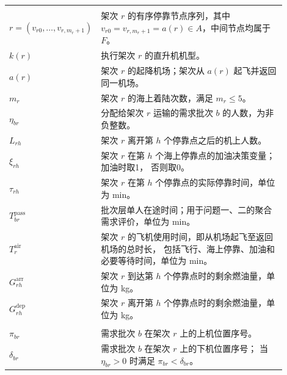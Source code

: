 \documentclass[UTF8,a4paper,zihao=5]{ctexart}
\begin{document}
\begin{longtable}{
    >{\centering\arraybackslash}p{0.20\linewidth}
    p{0.70\linewidth}
}
    \midrule
    \multicolumn{2}{l}{\textbf{路线状态变量}} \\[2pt]

    $r=(v_{r0},\ldots,v_{r,m_r+1})$
    & 架次 $r$ 的有序停靠节点序列，其中
    $v_{r0}=v_{r,m_r+1}=a(r)\in A$，中间节点均属于 $F$。 \\

    $k(r)$
    & 执行架次 $r$ 的直升机机型。 \\

    $a(r)$
    & 架次 $r$ 的起降机场；架次从 $a(r)$ 起飞并返回同一机场。 \\

    $m_r$
    & 架次 $r$ 的海上着陆次数，满足 $m_r\leq5$。 \\

    $\eta_{br}$
    & 分配给架次 $r$ 运输的需求批次 $b$ 的人数，为非负整数。 \\

    $L_{rh}$
    & 架次 $r$ 离开第 $h$ 个停靠点之后的机上人数。 \\

    $\xi_{rh}$
    & 架次 $r$ 在第 $h$ 个海上停靠点的加油决策变量；加油时取1，
    否则取0。 \\

    $\tau_{rh}$
    & 架次 $r$ 在第 $h$ 个停靠点的实际停靠时间，单位为 min。 \\

    $T_{br}^{\mathrm{pass}}$
    & 批次层单人在途时间；用于问题一、二的聚合需求评价，单位为 min。 \\

    $T_r^{\mathrm{air}}$
    & 架次 $r$ 的飞机使用时间，即从机场起飞至返回机场的总时长，
    包括飞行、海上停靠、加油和必要等待时间，单位为 min。 \\

    $G_{rh}^{\mathrm{arr}}$
    & 架次 $r$ 到达第 $h$ 个停靠点时的剩余燃油量，单位为 kg。 \\

    $G_{rh}^{\mathrm{dep}}$
    & 架次 $r$ 离开第 $h$ 个停靠点时的剩余燃油量，单位为 kg。 \\
\midrule
\multicolumn{2}{l}{\textbf{问题二决策变量与状态变量}} \\[2pt]

$\pi_{br}$
& 需求批次 $b$ 在架次 $r$ 上的上机位置序号。 \\

$\delta_{br}$
& 需求批次 $b$ 在架次 $r$ 上的下机位置序号；
当 $\eta_{br}>0$ 时满足
$\pi_{br}<\delta_{br}$。 \\


\end{longtable}
\end{document}
